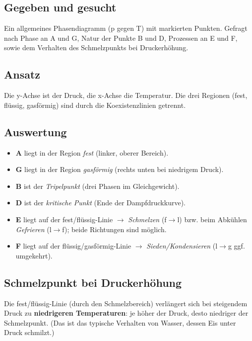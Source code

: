 
\subsection*{Gegeben und gesucht}
Ein allgemeines Phasendiagramm (p gegen T) mit markierten Punkten.
Gefragt nach Phase an A und G, Natur der Punkte B und D, Prozessen an E und F,
sowie dem Verhalten des Schmelzpunkts bei Druckerhöhung.

\subsection*{Ansatz}
Die y-Achse ist der Druck, die x-Achse die Temperatur. Die drei Regionen
(fest, flüssig, gasförmig) sind durch die Koexistenzlinien getrennt.

\subsection*{Auswertung}
\begin{itemize}
  \item \textbf{A} liegt in der Region \emph{fest} (linker, oberer Bereich).
  \item \textbf{G} liegt in der Region \emph{gasförmig} (rechts unten bei
        niedrigem Druck).
  \item \textbf{B} ist der \emph{Tripelpunkt} (drei Phasen im Gleichgewicht).
  \item \textbf{D} ist der \emph{kritische Punkt} (Ende der Dampfdruckkurve).
  \item \textbf{E} liegt auf der fest/flüssig-Linie $\rightarrow$
        \emph{Schmelzen} (f$\to$l) bzw. beim Abkühlen \emph{Gefrieren}
        (l$\to$f); beide Richtungen sind möglich.
  \item \textbf{F} liegt auf der flüssig/gasförmig-Linie $\rightarrow$
        \emph{Sieden/Kondensieren} (l$\to$g ggf. umgekehrt).
\end{itemize}

\subsection*{Schmelzpunkt bei Druckerhöhung}
Die fest/flüssig-Linie (durch den Schmelzbereich) verlängert sich bei
steigendem Druck zu \textbf{niedrigeren Temperaturen}: je höher der Druck,
desto niedriger der Schmelzpunkt. (Das ist das typische Verhalten von
Wasser, dessen Eis unter Druck schmilzt.)

